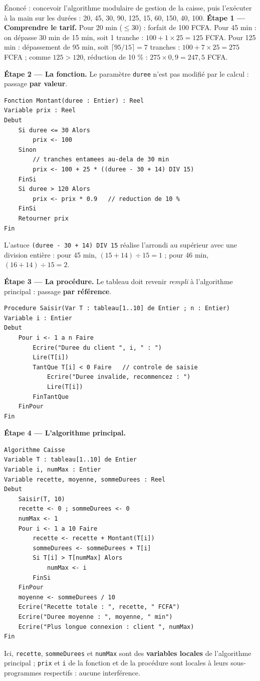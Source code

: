 \documentclass[11pt]{article}
\begin{document}
\begin{exoresolu}
Énoncé : concevoir l'algorithme modulaire de gestion de la caisse, puis l'exécuter à la main sur les durées : 20, 45, 30, 90, 125, 15, 60, 150, 40, 100.
\tcblower
\textbf{Étape 1 — Comprendre le tarif.} Pour 20 min ($\leq 30$) : forfait de 100 FCFA. Pour 45 min : on dépasse 30 min de 15 min, soit 1 tranche : $100 + 1 \times 25 = 125$ FCFA. Pour 125 min : dépassement de 95 min, soit $\lceil 95/15 \rceil = 7$ tranches : $100 + 7 \times 25 = 275$ FCFA ; comme $125 > 120$, réduction de 10 \% : $275 \times 0{,}9 = 247{,}5$ FCFA.

\textbf{Étape 2 — La fonction.} Le paramètre \texttt{duree} n'est pas modifié par le calcul : passage \textbf{par valeur}.
\begin{lstlisting}
Fonction Montant(duree : Entier) : Reel
Variable prix : Reel
Debut
    Si duree <= 30 Alors
        prix <- 100
    Sinon
        // tranches entamees au-dela de 30 min
        prix <- 100 + 25 * ((duree - 30 + 14) DIV 15)
    FinSi
    Si duree > 120 Alors
        prix <- prix * 0.9   // reduction de 10 %
    FinSi
    Retourner prix
Fin
\end{lstlisting}
L'astuce \texttt{(duree - 30 + 14) DIV 15} réalise l'arrondi au supérieur avec une division entière : pour 45 min, $(15+14) \div 15 = 1$ ; pour 46 min, $(16+14) \div 15 = 2$.

\textbf{Étape 3 — La procédure.} Le tableau doit revenir \emph{rempli} à l'algorithme principal : passage \textbf{par référence}.
\begin{lstlisting}
Procedure Saisir(Var T : tableau[1..10] de Entier ; n : Entier)
Variable i : Entier
Debut
    Pour i <- 1 a n Faire
        Ecrire("Duree du client ", i, " : ")
        Lire(T[i])
        TantQue T[i] < 0 Faire   // controle de saisie
            Ecrire("Duree invalide, recommencez : ")
            Lire(T[i])
        FinTantQue
    FinPour
Fin
\end{lstlisting}

\textbf{Étape 4 — L'algorithme principal.}
\begin{lstlisting}
Algorithme Caisse
Variable T : tableau[1..10] de Entier
Variable i, numMax : Entier
Variable recette, moyenne, sommeDurees : Reel
Debut
    Saisir(T, 10)
    recette <- 0 ; sommeDurees <- 0
    numMax <- 1
    Pour i <- 1 a 10 Faire
        recette <- recette + Montant(T[i])
        sommeDurees <- sommeDurees + T[i]
        Si T[i] > T[numMax] Alors
            numMax <- i
        FinSi
    FinPour
    moyenne <- sommeDurees / 10
    Ecrire("Recette totale : ", recette, " FCFA")
    Ecrire("Duree moyenne : ", moyenne, " min")
    Ecrire("Plus longue connexion : client ", numMax)
Fin
\end{lstlisting}
Ici, \texttt{recette}, \texttt{sommeDurees} et \texttt{numMax} sont des \textbf{variables locales} de l'algorithme principal ; \texttt{prix} et \texttt{i} de la fonction et de la procédure sont locales à leurs sous-programmes respectifs : aucune interférence.


\end{exoresolu}
\end{document}
